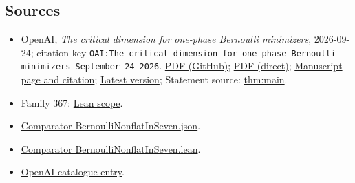 \documentclass[11pt]{article}
\begin{document}
\subsection{Sources}
\begin{itemize}
\item OpenAI, \emph{The critical dimension for one-phase Bernoulli minimizers}, 2026-09-24; citation key \texttt{OAI:The-critical-dimension-for-one-phase-Bernoulli-minimizers-September-24-2026}. \href{https://github.com/openai/math/blob/adc7f1241b42e322a6451854ab7e4b4c146bf78a/preprints/The-critical-dimension-for-one-phase-Bernoulli-minimizers-September-24-2026/The-critical-dimension-for-one-phase-Bernoulli-minimizers-September-24-2026.pdf}{PDF (GitHub)}; \href{https://github.com/openai/math/raw/adc7f1241b42e322a6451854ab7e4b4c146bf78a/preprints/The-critical-dimension-for-one-phase-Bernoulli-minimizers-September-24-2026/The-critical-dimension-for-one-phase-Bernoulli-minimizers-September-24-2026.pdf}{PDF (direct)}; \href{https://github.com/openai/math/blob/adc7f1241b42e322a6451854ab7e4b4c146bf78a/preprints/The-critical-dimension-for-one-phase-Bernoulli-minimizers-September-24-2026/README.md}{Manuscript page and citation}; \href{https://github.com/openai/math/blob/main/preprints/The-critical-dimension-for-one-phase-Bernoulli-minimizers-September-24-2026/The-critical-dimension-for-one-phase-Bernoulli-minimizers-September-24-2026.pdf}{Latest version}; Statement source: \href{https://github.com/openai/math/blob/adc7f1241b42e322a6451854ab7e4b4c146bf78a/preprints/The-critical-dimension-for-one-phase-Bernoulli-minimizers-September-24-2026/build/paper.tex\#L73}{thm:main}.
\item Family 367: \href{https://github.com/openai/math/blob/adc7f1241b42e322a6451854ab7e4b4c146bf78a/lean/docs/367.md}{Lean scope}.
\item \href{https://github.com/openai/math/blob/adc7f1241b42e322a6451854ab7e4b4c146bf78a/lean/ComparatorChallenges/BernoulliNonflatInSeven.json}{Comparator BernoulliNonflatInSeven.json}.
\item \href{https://github.com/openai/math/blob/adc7f1241b42e322a6451854ab7e4b4c146bf78a/lean/ComparatorChallenges/BernoulliNonflatInSeven.lean}{Comparator BernoulliNonflatInSeven.lean}.
\item \href{https://github.com/openai/math/blob/adc7f1241b42e322a6451854ab7e4b4c146bf78a/CONTENTS.md}{OpenAI catalogue entry}.
\end{itemize}
\end{document}
